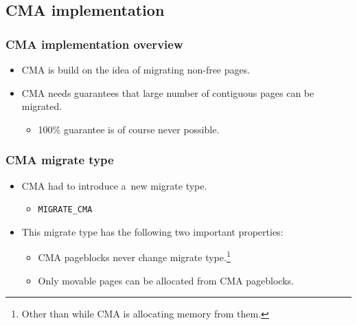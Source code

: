 \subsection{CMA implementation}

\begin{frame}
  \frametitle{CMA implementation overview}

  \begin{itemize}
  \item CMA is build on the idea of migrating non-free pages.
  \item CMA needs guarantees that large number of contiguous pages can
    be migrated.
    \begin{itemize}
    \item 100\% guarantee is of course never possible.
    \end{itemize}
  \end{itemize}
\end{frame}

\begin{frame}[fragile]
  \frametitle{CMA migrate type}

  \begin{itemize}
  \item CMA had to introduce a~new migrate type.
    \begin{itemize}
    \item \lstinline|MIGRATE_CMA|
    \end{itemize}
  \item This migrate type has the following two important properties:
    \begin{itemize}
    \item CMA pageblocks never change migrate type.\footnote{Other
      than while CMA is allocating memory from them.}
    \item Only movable pages can be allocated from CMA pageblocks.
    \end{itemize}
  \end{itemize}
\end{frame}

